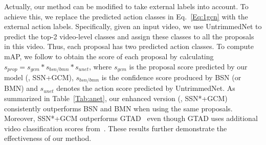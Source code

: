 \documentclass[10pt,journal,compsoc]{IEEEtran}
\begin{document}
	Actually, our method can be modified to take external labels into account. 
		To achieve this, we replace the predicted action classes in Eq.~\eqref{Eq:1gcn} with the external action labels. Specifically, given an input video, we use UntrimmedNet to predict the top-2 video-level classes and assign these classes to all the proposals in this video. Thus, each proposal has two predicted action classes.
		To compute mAP, we follow \cite{lin2018bsn} to obtain the score of each proposal by calculating $s_{prop} = s_{gcm} * s_{bsn/bmn} * s_{unet}$,
		where $s_{gcm}$ is the proposal score predicted by our model (\ie, SSN+GCM),
		$s_{bsn/bmn}$ is the confidence score produced by BSN (or BMN)
		and $s_{unet}$ denotes the action score predicted by UntrimmedNet.
		As summarized in Table~\ref{Tab:anet},  our enhanced version (\ie, SSN*+GCM) consistently outperforms BSN and BMN when using the same proposals. Moreover, SSN*+GCM outperforms GTAD~\cite{xu2020gtad} even though GTAD uses additional video classification scores from~\cite{wang2017untrimmed}. These results further demonstrate the effectiveness of our method.
	
\end{document}
